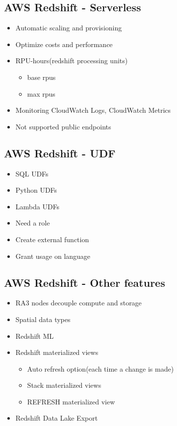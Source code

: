 \documentclass[../main.tex]{subfiles}
\begin{document}
\subsection{AWS Redshift - Serverless}
\begin{itemize}
    \item Automatic scaling and provisioning
    \item Optimize costs and performance
    \item RPU-hours(redshift processing units)
    \begin{itemize}
        \item base rpus
        \item max rpus
    \end{itemize}
    \item Monitoring CloudWatch Logs, CloudWatch Metrics
    \item Not supported public endpoints
\end{itemize}

\subsection{AWS Redshift - UDF}
\begin{itemize}
    \item SQL UDFs
    \item Python UDFs
    \item Lambda UDFs
    \item Need a role
    \item Create external function
    \item Grant usage on language
\end{itemize}

\subsection{AWS Redshift - Other features}
\begin{itemize}
    \item RA3 nodes decouple compute and storage
    \item Spatial data types
    \item Redshift ML
    \item Redshift materialized views
    \begin{itemize}
        \item Auto refresh option(each time a change is made)
        \item Stack materialized views
        \item REFRESH materialized view
    \end{itemize}
    \item Redshift Data Lake Export
\end{itemize}
\end{document}

